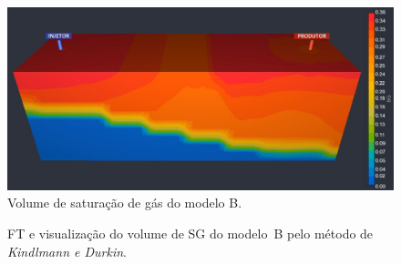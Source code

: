 \begin{figure}[h]
	\centering
	\includegraphics[width=1\textwidth]{images/r_box_sg_slice}
	\caption{Volume de saturação de gás do modelo B.}
	\label{fig:r_box_sg_slice}
\end{figure}

\begin{figure}[h]
	\centering
	\caption{FT e visualização do volume de SG do modelo~B pelo método de \textit{Kindlmann e Durkin}.}
	\label{fig:r_box_sg_kd}
\end{figure}

